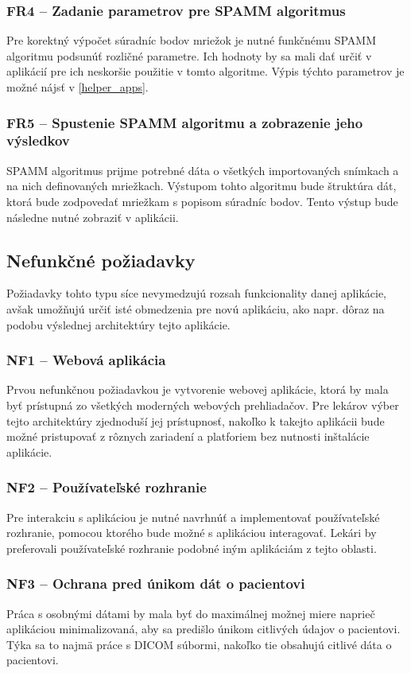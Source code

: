 \subsubsection {FR4 -- Zadanie parametrov pre SPAMM algoritmus}\label{fr4}
Pre korektný výpočet súradníc bodov mriežok je nutné funkčnému SPAMM algoritmu podsunúť rozličné parametre. Ich hodnoty by sa mali dať určiť v aplikácií pre ich neskoršie použitie v tomto algoritme. Výpis týchto parametrov je možné nájsť v \ref{helper_apps}.

\subsubsection {FR5 -- Spustenie SPAMM algoritmu a zobrazenie jeho výsledkov}\label{fr5}
SPAMM algoritmus prijme potrebné dáta o všetkých importovaných snímkach a na nich definovaných mriežkach. Výstupom tohto algoritmu bude štruktúra dát, ktorá bude zodpovedať mriežkam s popisom súradníc bodov. Tento výstup bude následne nutné zobraziť v aplikácii.

\subsection {Nefunkčné požiadavky}
Požiadavky tohto typu síce nevymedzujú rozsah funkcionality danej aplikácie, avšak umožňujú určiť isté obmedzenia pre novú aplikáciu, ako napr. dôraz na podobu výslednej architektúry tejto aplikácie.

\subsubsection {NF1 -- Webová aplikácia}
Prvou nefunkčnou požiadavkou je vytvorenie webovej aplikácie, ktorá by mala byť prístupná zo všetkých moderných webových prehliadačov. Pre lekárov výber tejto architektúry zjednoduší jej prístupnosť, nakoľko k takejto aplikácii bude možné pristupovať z rôznych zariadení a platforiem bez nutnosti inštalácie aplikácie.

\subsubsection {NF2 -- Používateľské rozhranie}
Pre interakciu s aplikáciou je nutné navrhnúť a implementovať používateľské rozhranie, pomocou ktorého bude možné s aplikáciou interagovať. Lekári by preferovali používateľské rozhranie podobné iným aplikáciám z tejto oblasti.

\subsubsection {NF3 -- Ochrana pred únikom dát o pacientovi}
Práca s osobnými dátami by mala byť do maximálnej možnej miere naprieč aplikáciou minimalizovaná, aby sa predišlo únikom citlivých údajov o pacientovi. Týka sa to najmä práce s DICOM súbormi, nakoľko tie obsahujú citlivé dáta o pacientovi.

